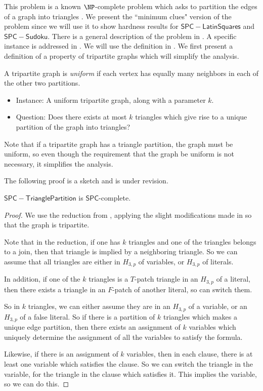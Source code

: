 \documentclass[runningheads,a4paper]{llncs}
\begin{document}
This problem is a known $\NP$-complete problem which asks to partition the edges of a graph into triangles \cite{holyer1981np}. We present the ``minimum clues" version of the problem since we will use it to show hardness results for $\mathsf{SPC-Latin Squares}$ and $\mathsf{SPC-Sudoku}$. There is a general description of the problem in \cite{holyer1981np}. A specific instance is addressed in \cite{colbourn1984complexity}. We will use the definition in \cite{colbourn1984complexity}. We first present a definition of a property of tripartite graphs which will simplify the analysis.

\begin{definition}
A tripartite graph is \emph{uniform} if each vertex has equally many neighbors in each of the other two partitions.
\end{definition}

\begin{itemize}
\item Instance: A uniform tripartite graph, along with a parameter $k$.
\item Question: Does there exists at most $k$ triangles which give rise to a unique partition of the graph into triangles?
\end{itemize}

Note that if a tripartite graph has a triangle partition, the graph must be uniform, so even though the requirement that the graph be uniform is not necessary, it simplifies the analysis.

The following proof is a sketch and is under revision.

\begin{theorem}
$\mathsf{SPC-Triangle Partition}$ is $\mathsf{SPC}$-complete.
\end{theorem}

\begin{proof}
We use the reduction from \cite{holyer1981np}, applying the slight modifications made in \cite{colbourn1984complexity} so that the graph is tripartite. 

Note that in the reduction, if one has $k$ triangles and one of the triangles belongs to a join, then that triangle is implied by a neighboring triangle. So we can assume that all triangles are either in $H_{3,p}$ of variables, or $H_{3,p}$ of literals. 

In addition, if one of the $k$ triangles is a $T$-patch triangle in an $H_{3,p}$ of a literal, then there exists a triangle in an $F$-patch of another literal, so can switch them.

So in $k$ triangles, we can either assume they are in an $H_{3,p}$ of a variable, or an $H_{3,p}$ of a false literal. So if there is a partition of $k$ triangles which makes a unique edge partition, then there exists an assignment of $k$ variables which uniquely determine the assignment of all the variables to satisfy the formula. 

Likewise, if there is an assignment of $k$ variables, then in each clause, there is at least one variable which satisfies the clause. So we can switch the triangle in the variable, for the triangle in the clause which satisfies it. This implies the variable, so we can do this.
\end{proof}
\end{document}
